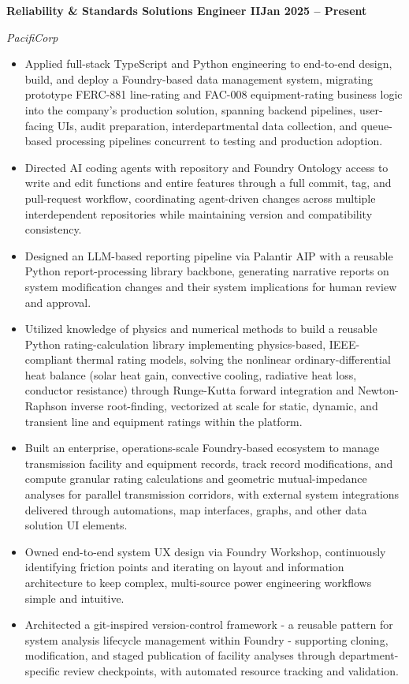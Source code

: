 \documentclass[10pt, letterpaper]{article}
\newcommand{\jobline}[2]{%
  \vspace{5pt}%
  \noindent\textbf{#1}\hfill\textbf{#2}\par%
  \vspace{1pt}%
}
\newcommand{\subline}[1]{%
  \vspace{-1pt}%
  \noindent\textit{#1}\par%
  \vspace{1pt}%
}
\newenvironment{rlist}{%
  \begin{itemize}[leftmargin=1.4em, itemsep=1pt, topsep=2pt, parsep=0pt]%
}{%
  \end{itemize}%
}
\begin{document}
\jobline{Reliability \& Standards Solutions Engineer II}{Jan 2025 -- Present}
\subline{PacifiCorp}
\begin{rlist}
  \item Applied full-stack TypeScript and Python engineering to end-to-end design, build, and deploy a Foundry-based data management system, migrating prototype FERC-881 line-rating and FAC-008 equipment-rating business logic into the company's production solution, spanning backend pipelines, user-facing UIs, audit preparation, interdepartmental data collection, and queue-based processing pipelines concurrent to testing and production adoption.
  \item Directed AI coding agents with repository and Foundry Ontology access to write and edit functions and entire features through a full commit, tag, and pull-request workflow, coordinating agent-driven changes across multiple interdependent repositories while maintaining version and compatibility consistency.
  \item Designed an LLM-based reporting pipeline via Palantir AIP with a reusable Python report-processing library backbone, generating narrative reports on system modification changes and their system implications for human review and approval.
  \item Utilized knowledge of physics and numerical methods to build a reusable Python rating-calculation library implementing physics-based, IEEE-compliant thermal rating models, solving the nonlinear ordinary-differential heat balance (solar heat gain, convective cooling, radiative heat loss, conductor resistance) through Runge-Kutta forward integration and Newton-Raphson inverse root-finding, vectorized at scale for static, dynamic, and transient line and equipment ratings within the platform.
  \item Built an enterprise, operations-scale Foundry-based ecosystem to manage transmission facility and equipment records, track record modifications, and compute granular rating calculations and geometric mutual-impedance analyses for parallel transmission corridors, with external system integrations delivered through automations, map interfaces, graphs, and other data solution UI elements.
  \item Owned end-to-end system UX design via Foundry Workshop, continuously identifying friction points and iterating on layout and information architecture to keep complex, multi-source power engineering workflows simple and intuitive.
  \item Architected a git-inspired version-control framework - a reusable pattern for system analysis lifecycle management within Foundry - supporting cloning, modification, and staged publication of facility analyses through department-specific review checkpoints, with automated resource tracking and validation.

\end{rlist}
\end{document}
